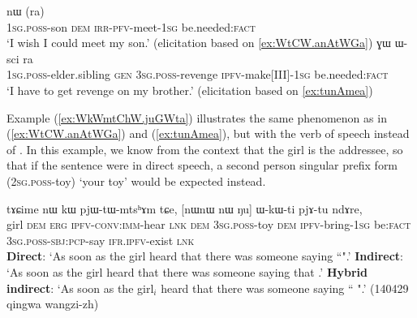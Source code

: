 \begin{exe}
\ex
\begin{xlist}
\ex \label{ex:WtCW.anAtWGa2}
\gll {} nɯ  (ra) \\
 \textsc{1sg}.\textsc{poss}-son \textsc{dem} \textsc{irr}-\textsc{pfv}-meet-\textsc{1sg} be.needed:\textsc{fact}\\
\glt `I wish I could meet my son.' (elicitation based on \ref{ex:WtCW.anAtWGa})
\ex \label{ex:tunAmea2}
\gll {} ɣɯ ɯ-sci  ra \\
 {\textsc{1sg}.\textsc{poss}-elder.sibling}  \textsc{gen} \textsc{3sg}.\textsc{poss}-revenge {\textsc{ipfv}-make[III]-\textsc{1sg}} be.needed:\textsc{fact}  \\
\glt `I have to get revenge on my brother.' (elicitation based on \ref{ex:tunAmea})
\end{xlist}
  \end{exe}
    
Example (\ref{ex:WkWmtChW.juGWta}) illustrates the same phenomenon as in (\ref{ex:WtCW.anAtWGa}) and (\ref{ex:tunAmea}), but with the verb of speech  instead of . In this example, we know from the context that the girl is the addressee, so that if the sentence were in direct speech, a second person singular prefix form  (\textsc{2sg}.\textsc{poss}-toy) `your toy' would be expected instead.
 
\begin{exe}
\ex \label{ex:WkWmtChW.juGWta}
\gll  tɤɕime nɯ kɯ pjɯ-tɯ-mtsʰɤm tɕe, [nɯnɯ  nɯ  	 ŋu] ɯ-kɯ-ti pjɤ-tu ndɤre, \\
girl \textsc{dem} \textsc{erg} \textsc{ipfv}-\textsc{conv}:\textsc{imm}-hear \textsc{lnk} \textsc{dem}  \textsc{3sg}.\textsc{poss}-toy  \textsc{dem}  \textsc{ipfv}-bring-\textsc{1sg}  be:\textsc{fact} \textsc{3sg}.\textsc{poss}-\textsc{sbj}:\textsc{pcp}-say \textsc{ifr}.\textsc{ipfv}-exist \textsc{lnk} \\
\glt   \textbf{Direct}: `As soon as the girl heard that there was someone saying ``".'
\glt   \textbf{Indirect}:  `As soon as the girl heard that there was someone saying that .'
\glt   \textbf{Hybrid indirect}: `As soon as the girl$_i$ heard that there was someone saying `` ".' (140429 qingwa wangzi-zh)
\end{exe}



